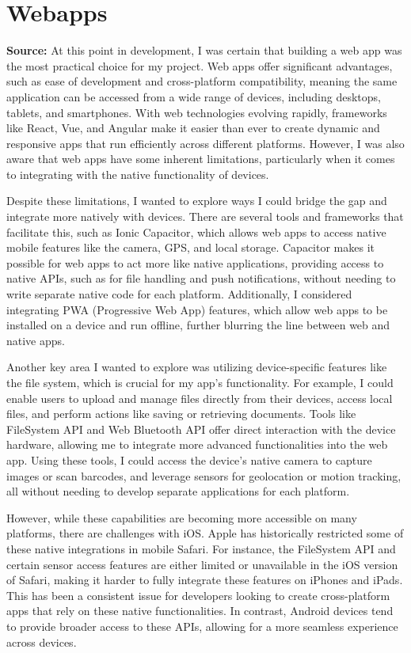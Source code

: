 \section{Webapps}
\label{research:Webapps}
\textbf{Source:} \cite{asterWhatAreAdvantages2025} \cite{CapacitorCrossplatformNative}
At this point in development, I was certain that building a web app was the most practical choice for my project. Web apps offer significant advantages, such as ease of development and cross-platform compatibility, meaning the same application can be accessed from a wide range of devices, including desktops, tablets, and smartphones. With web technologies evolving rapidly, frameworks like React, Vue, and Angular make it easier than ever to create dynamic and responsive apps that run efficiently across different platforms. However, I was also aware that web apps have some inherent limitations, particularly when it comes to integrating with the native functionality of devices.

Despite these limitations, I wanted to explore ways I could bridge the gap and integrate more natively with devices. There are several tools and frameworks that facilitate this, such as Ionic Capacitor, which allows web apps to access native mobile features like the camera, GPS, and local storage. Capacitor makes it possible for web apps to act more like native applications, providing access to native APIs, such as for file handling and push notifications, without needing to write separate native code for each platform. Additionally, I considered integrating PWA (Progressive Web App) features, which allow web apps to be installed on a device and run offline, further blurring the line between web and native apps.

Another key area I wanted to explore was utilizing device-specific features like the file system, which is crucial for my app’s functionality. For example, I could enable users to upload and manage files directly from their devices, access local files, and perform actions like saving or retrieving documents. Tools like FileSystem API and Web Bluetooth API offer direct interaction with the device hardware, allowing me to integrate more advanced functionalities into the web app. Using these tools, I could access the device’s native camera to capture images or scan barcodes, and leverage sensors for geolocation or motion tracking, all without needing to develop separate applications for each platform.

However, while these capabilities are becoming more accessible on many platforms, there are challenges with iOS. Apple has historically restricted some of these native integrations in mobile Safari. For instance, the FileSystem API and certain sensor access features are either limited or unavailable in the iOS version of Safari, making it harder to fully integrate these features on iPhones and iPads. This has been a consistent issue for developers looking to create cross-platform apps that rely on these native functionalities. In contrast, Android devices tend to provide broader access to these APIs, allowing for a more seamless experience across devices.

